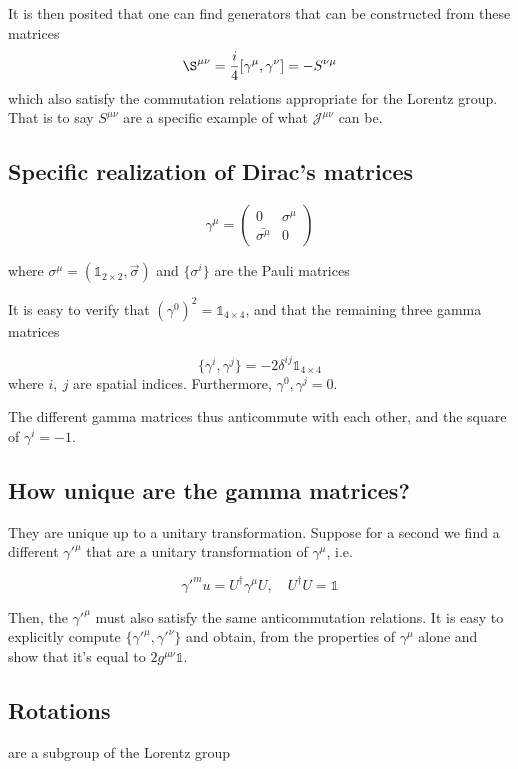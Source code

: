 \documentclass[11pt]{article}
\begin{document}
		It is then posited that one can find generators that can be constructed from these matrices\[ \S^{\mu\nu} = \frac{i}{4} [\gamma^\mu, \gamma^\nu] = -S^{\nu\mu}\] which also satisfy the commutation relations appropriate for the Lorentz group. That is to say $S^{\mu\nu}$ are a specific example of what $\mathcal{J}^{\mu\nu}$ can be.
		
		\subsection*{Specific realization of Dirac's matrices}
		
		\[ \gamma^\mu = \begin{pmatrix}
			0 & \sigma^\mu\\
			\bar{\sigma^\mu} & 0 
		\end{pmatrix}\]	

	where $\sigma^\mu = (\mathbb{1}_{2\times 2}, \vec{\sigma})$ and $\{\sigma^i\}$ are the Pauli matrices
	
	It is easy to verify that $(\gamma^0)^2 = \mathbb{1}_{4\times 4}$, and that the remaining three gamma matrices
	
	\[ \{\gamma^i, \gamma^j\} = -2\delta^{ij} \mathbb{1}_{4\times 4}\] where $i,\ j$ are spatial indices. Furthermore, ${\gamma^0, \gamma^j} = 0$. 
	
	The different gamma matrices thus anticommute with each other, and the square of $\gamma^i = -1$.\\
	
	\subsection*{How unique are the gamma matrices?}
	They are unique up to a unitary transformation. 
	Suppose for a second we find a different $\gamma'^\mu$ that are a unitary transformation of $\gamma^\mu$, i.e.
	
	\[ \gamma'^mu = U^\dagger \gamma^\mu U,\quad U^\dagger U = \mathbb{1}\]
	
	Then, the $\gamma'^\mu$ must also satisfy the same anticommutation relations. It is easy to explicitly compute $\{\gamma'^\mu, \gamma'^\nu\}$ and obtain, from the properties of $\gamma^\mu$ alone and show that it's equal to $2g^{\mu\nu} \mathbb{1}$.
	
	
	\subsection*{Rotations}
	are a subgroup of the Lorentz group
	
\end{document}
